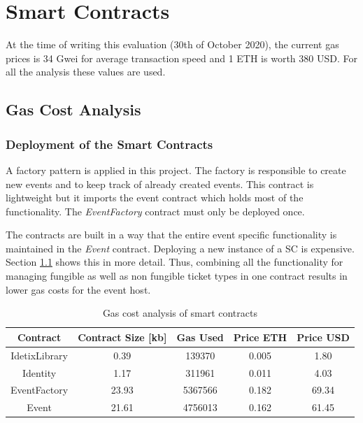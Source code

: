 
\section{Smart Contracts}\label{sec:smart_cont:eval}

At the time of writing this evaluation (30th of October 2020), the current gas prices is 34 Gwei for average transaction speed and 1 ETH is worth 380 USD. For all the analysis these values are used.

\subsection{Gas Cost Analysis}\label{subsection:gas-cost-analysis}

\subsubsection{Deployment of the Smart Contracts}

A factory pattern is applied in this project. The factory is responsible to create new events and to keep track of already created events. This contract is lightweight but it imports the event contract which holds most of the functionality. The \textit{EventFactory} contract must only be deployed once. 

The contracts are built in a way that the entire event specific functionality is maintained in the \textit{Event} contract. Deploying a new instance of a SC is expensive. Section \ref{subsection:gas-cost-analysis} shows this in more detail. Thus, combining all the functionality for managing fungible as well as non fungible ticket types in one contract results in lower gas costs for the event host. 

\begin{table}[ht]
\centering
\begin{tabular}{|c|c|c|c|c|}
\hline
\textbf{Contract} & \textbf{Contract Size {[}kb{]}} & \textbf{Gas Used} & \textbf{Price ETH} & \textbf{Price USD} \\ \hline
IdetixLibrary     & 0.39                         & 139370            & 0.005              & 1.80               \\ \hline
Identity          & 1.17                         & 311961            & 0.011              & 4.03               \\ \hline
EventFactory      & 23.93                       & 5367566           & 0.182              & 69.34              \\ \hline
Event             & 21.61                        & 4756013           & 0.162              & 61.45              \\ \hline
\end{tabular}
\caption{Gas cost analysis of smart contracts}
\label{tab:gas-cost-analysis-sc}
\end{table}

